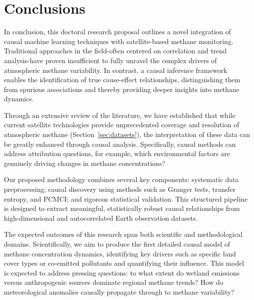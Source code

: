 \label{chap:conclusion}
\cleardoublepage

\section{Conclusions}

In conclusion, this doctoral research proposal outlines a novel integration of causal machine learning techniques with satellite-based methane monitoring. Traditional approaches in the field-often centered on correlation and trend analysis-have proven insufficient to fully unravel the complex drivers of atmospheric methane variability. In contrast, a causal inference framework enables the identification of true cause-effect relationships, distinguishing them from spurious associations and thereby providing deeper insights into methane dynamics.

Through an extensive review of the literature, we have established that while current satellite technologies provide unprecedented coverage and resolution of atmospheric methane (Section~\ref{sec:datasets}), the interpretation of these data can be greatly enhanced through causal analysis. Specifically, causal methods can address attribution questions, for example, which environmental factors are genuinely driving changes in methane concentrations?

Our proposed methodology combines several key components: systematic data preprocessing; causal discovery using methods such as Granger tests, transfer entropy, and PCMCI; and rigorous statistical validation. This structured pipeline is designed to extract meaningful, statistically robust causal relationships from high-dimensional and autocorrelated Earth observation datasets.

The expected outcomes of this research span both scientific and methodological domains. Scientifically, we aim to produce the first detailed causal model of methane concentration dynamics, identifying key drivers such as specific land cover types or co-emitted pollutants and quantifying their influence. This model is expected to address pressing questions: to what extent do wetland emissions versus anthropogenic sources dominate regional methane trends? How do meteorological anomalies causally propagate through to methane variability?

